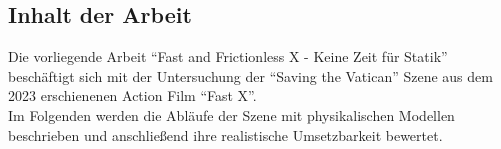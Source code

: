 \subsection{Inhalt der Arbeit}
Die vorliegende Arbeit \enquote{Fast and Frictionless X - Keine Zeit für Statik} beschäftigt sich mit der Untersuchung der \enquote{Saving the Vatican} Szene aus dem 2023 erschienenen Action Film \enquote{Fast X}.\\
Im Folgenden werden die Abläufe der Szene mit physikalischen Modellen beschrieben und anschließend ihre realistische Umsetzbarkeit bewertet.


